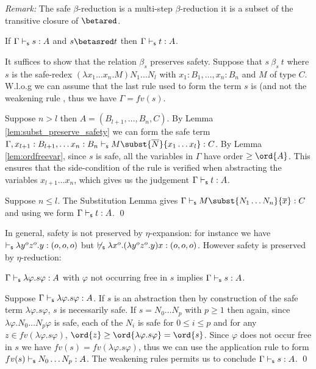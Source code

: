 \noindent \emph{Remark:} The safe $\beta$-reduction is a multi-step
$\beta$-reduction \ie it is a subset of the transitive closure of
$\betared$.


\begin{lemma}
\label{lem:safered_preserve_safety}
If $\Gamma \vdash_{\sf s} s :A$ and $s \betasred t$ then $\Gamma \vdash_{\sf s} t :A$.
\end{lemma}

\proof
  It suffices to show that the relation $\beta_s$ preserves safety.
Suppose that $s\ \beta_s\ t$ where $s$ is the
safe-redex $(\lambda x_1 \ldots x_n . M) N_1
  \ldots N_l $ with $x_1 : B_1, \ldots, x_n: B_n$
and $M$ of type $C$.  W.l.o.g we can assume that the last rule used
to form the term $s$ is  (and not the weakening rule
, thus  we have $\Gamma = fv(s)$.

Suppose $n>l$ then $A = (B_{l+1}, \ldots, B_n, C)$. By Lemma \ref{lem:subst_preserve_safety} we can form the safe term %
$\Gamma, x_{l+1}:B_{l+1}, \ldots x_n :B_{n}\sentail M\subst{\overline{N}}{x_1 \ldots x_l} : C$. %
By Lemma \ref{lem:ordfreevar}, since $s$ is safe, all the variables
in $\Gamma$ have order $\geq \ord{A}$. This ensures that the
side-condition of the  rule is verified when
abstracting the variables $x_{l+1} \ldots x_n$, which gives us the
judgement $\Gamma \vdash_{\sf s} t :A$.

Suppose $n \leq l$. The Substitution Lemma gives $\Gamma \sentail
M\subst{N_1 \ldots N_n}{\overline{x}} : C$ and using 
we form $\Gamma \vdash_{\sf s} t :A$.
  \qed


In general, safety is not preserved by $\eta$-expansion: for
instance we have
$\vdash_{\sf s} \lambda y^o z^o . y : (o,o,o)$ but
$\not \vdash_{\sf s}\lambda x^o . (\lambda y^o z^o . y) x : (o,o,o)$.
However safety is preserved by $\eta$-reduction:

\begin{lemma}
\label{lem:etared_preserve_safety}
  $\Gamma \vdash_{\sf s} \lambda \varphi . s \varphi :A $ with $\varphi$ not
  occurring free in $s$ implies $\Gamma \vdash_{\sf s} s :A$.
\end{lemma}
\proof
  Suppose $\Gamma \vdash_{\sf s} \lambda \varphi . s \varphi :A$. If $s$ is an  abstraction then by construction of the safe term $\lambda \varphi . s \varphi$, $s$ is necessarily safe.  If $s = N_0 \ldots N_p$ with
  $p\geq 1$ then again, since $\lambda \varphi . N_0 \ldots N_p
  \varphi$ is safe, each of the $N_i$ is safe for $0 \leq i \leq p$
  and for any $z\in fv(\lambda \varphi . s \varphi)$, $\ord{z} \geq
  \ord{\lambda \varphi . s \varphi} = \ord{s}$. Since  $\varphi$ does not occur free in $s$ we have $fv(s) = fv(\lambda \varphi . s \varphi)$, thus we can use the application rule to form $fv(s) \vdash_{\sf s} N_0 \ldots N_p : A$. The weakening rules permits us to conclude $\Gamma \vdash_{\sf s} s :A$. \qed



